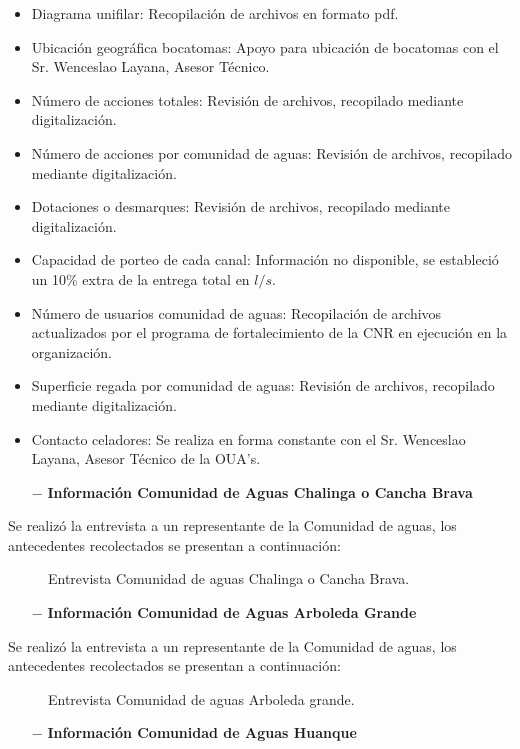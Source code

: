 \documentclass[]{article}
\begin{document}
\begin{itemize}	
	\item Diagrama unifilar: Recopilación de archivos en formato pdf.
	\item Ubicación geográfica bocatomas: Apoyo para ubicación de bocatomas con el Sr. Wenceslao Layana, Asesor Técnico.
	\item Número de acciones totales: Revisión de archivos, recopilado mediante digitalización.
	\item Número de acciones por comunidad de aguas: Revisión de archivos, recopilado mediante digitalización.
	\item Dotaciones o desmarques: Revisión de archivos, recopilado mediante digitalización.
	\item Capacidad de porteo de cada canal: Información no disponible, se estableció un 10\% extra de la entrega total en $l/s$.
	\item Número de usuarios comunidad de aguas: Recopilación de archivos actualizados por el programa de fortalecimiento de la CNR en ejecución en la organización.
	\item Superficie regada por comunidad de aguas: Revisión de archivos, recopilado mediante digitalización.
	\item Contacto celadores: Se realiza en forma constante con el Sr. Wenceslao Layana, Asesor Técnico de la OUA's.
\end{itemize}
\clearpage
\begin{itemize}
	\item[$-$] \textbf{Información Comunidad de Aguas Chalinga o Cancha Brava}
\end{itemize}

Se realizó la entrevista a un representante de la Comunidad de aguas, los antecedentes recolectados se presentan a continuación:

\begin{figure} [H]
	\caption{Entrevista Comunidad de aguas Chalinga o Cancha Brava.}
\end{figure}
\clearpage
\begin{itemize}
	\item[$-$] \textbf{Información Comunidad de Aguas Arboleda Grande}
\end{itemize}

Se realizó la entrevista a un representante de la Comunidad de aguas, los antecedentes recolectados se presentan a continuación:

\begin{figure} [H]
	\caption{Entrevista Comunidad de aguas Arboleda grande.}
\end{figure}
\clearpage
\begin{itemize}
	\item[$-$] \textbf{Información Comunidad de Aguas Huanque}
\end{itemize}
\end{document}
